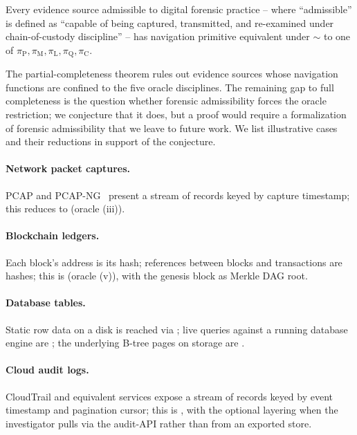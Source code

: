 \begin{conjecture}
\label{conj:full-complete}
Every evidence source admissible to digital forensic practice -- where
``admissible'' is defined as ``capable of being captured, transmitted, and
re-examined under chain-of-custody discipline'' -- has navigation primitive
equivalent under $\sim$ to one of $\pi_{\mathrm{P}}, \pi_{\mathrm{M}},
\pi_{\mathrm{L}}, \pi_{\mathrm{Q}}, \pi_{\mathrm{C}}$.
\end{conjecture}

The partial-completeness theorem rules out evidence sources whose
navigation functions are confined to the five oracle disciplines. The
remaining gap to full completeness is the question whether forensic
admissibility forces the oracle restriction; we conjecture that it does,
but a proof would require a formalization of forensic admissibility that
we leave to future work. We list illustrative cases and their reductions
in support of the conjecture.

\paragraph{Network packet captures.} PCAP and PCAP-NG~\cite{pcapng2024}
present a stream of records keyed by capture timestamp; this reduces to
 (oracle (iii)).

\paragraph{Blockchain ledgers.} Each block's address is its hash; references
between blocks and transactions are hashes; this is  (oracle (v)),
with the genesis block as Merkle DAG root.

\paragraph{Database tables.} Static row data on a disk is reached via
; live queries against a running database engine are ;
the underlying B-tree pages on storage are .

\paragraph{Cloud audit logs.} CloudTrail and equivalent services expose a
stream of records keyed by event timestamp and pagination cursor; this is
, with the optional  layering when the investigator pulls via
the audit-API rather than from an exported store.

